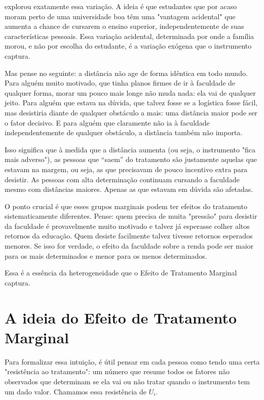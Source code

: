 \citet{Card1995} explorou exatamente essa variação. A ideia é que estudantes que por acaso moram perto de uma universidade boa têm uma "vantagem acidental" que aumenta a chance de cursarem o ensino superior, independentemente de suas características pessoais. Essa variação acidental, determinada por onde a família morou, e não por escolha do estudante, é a variação exógena que o instrumento captura.

Mas pense no seguinte: a distância não age de forma idêntica em todo mundo. Para alguém muito motivado, que tinha planos firmes de ir à faculdade de qualquer forma, morar um pouco mais longe não muda nada: ela vai de qualquer jeito. Para alguém que estava na dúvida, que talvez fosse se a logística fosse fácil, mas desistiria diante de qualquer obstáculo a mais: uma distância maior pode ser o fator decisivo. E para alguém que claramente não ia à faculdade independentemente de qualquer obstáculo, a distância também não importa.

Isso significa que à medida que a distância aumenta (ou seja, o instrumento "fica mais adverso"), as pessoas que ``saem'' do tratamento são justamente aquelas que estavam na margem, ou seja, as que precisavam de pouco incentivo extra para desistir. As pessoas com alta determinação continuam cursando a faculdade mesmo com distâncias maiores. Apenas as que estavam em dúvida são afetadas.

O ponto crucial é que esses grupos marginais podem ter efeitos do tratamento sistematicamente diferentes. Pense: quem precisa de muita "pressão" para desistir da faculdade é provavelmente muito motivado e talvez já esperasse colher altos retornos da educação. Quem desiste facilmente talvez tivesse retornos esperados menores. Se isso for verdade, o efeito da faculdade sobre a renda pode ser maior para os mais determinados e menor para os menos determinados.

Essa é a essência da heterogeneidade que o Efeito de Tratamento Marginal captura.

\section{A ideia do Efeito de Tratamento Marginal}
\label{sec:mte_definicao}

Para formalizar essa intuição, é útil pensar em cada pessoa como tendo uma certa "resistência ao tratamento": um número que resume todos os fatores não observados que determinam se ela vai ou não tratar quando o instrumento tem um dado valor. Chamamos essa resistência de $U_i$.

